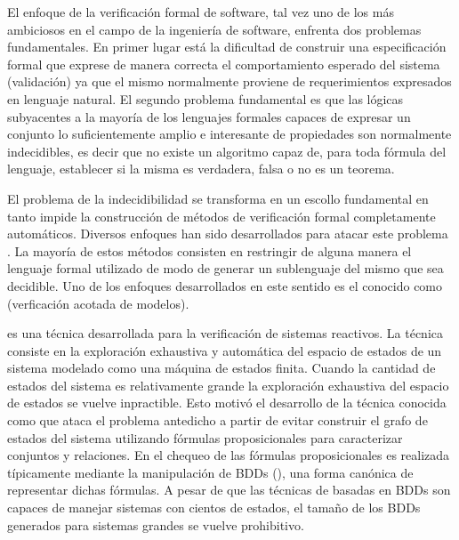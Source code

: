 El enfoque de la verificación formal de software, tal vez uno de los más
ambiciosos en el campo de la ingeniería de software, enfrenta dos problemas
fundamentales. En primer lugar está la dificultad de construir una
especificación formal que exprese de manera correcta el comportamiento
esperado del sistema (validación) ya que el mismo normalmente proviene de
requerimientos expresados en lenguaje natural. El segundo problema fundamental
es que las lógicas subyacentes a la mayoría de los lenguajes formales capaces
de expresar un conjunto lo suficientemente amplio e interesante de propiedades
son normalmente indecidibles, es decir que no existe un algoritmo capaz de,
para toda fórmula del lenguaje, establecer si la misma es verdadera, falsa o
no es un teorema.

El problema de la indecidibilidad se transforma en un escollo fundamental en
tanto impide la construcción de métodos de verificación formal completamente
automáticos. Diversos enfoques han sido desarrollados para atacar este
problema . La mayoría de estos métodos consisten en
restringir de alguna manera el lenguaje formal utilizado de modo de generar un
sublenguaje del mismo que sea decidible. Uno de los enfoques desarrollados en
este sentido es el conocido como \bmc (verficación acotada de modelos).

\mc\cite{emerson:scp-2_3} es una técnica desarrollada para la verificación de
sistemas reactivos. La técnica consiste en la exploración exhaustiva y
automática del espacio de estados de un sistema modelado como una máquina de
estados finita. Cuando la cantidad de estados del sistema es relativamente
grande la exploración exhaustiva del espacio de estados se vuelve inpractible.
Esto motivó el desarrollo de la técnica conocida como \smc\cite{burch:lics90,
mcmillan93} que ataca el problema antedicho a partir de evitar construir el
grafo de estados del sistema utilizando fórmulas proposicionales para
caracterizar conjuntos y relaciones. En \smc el chequeo de las fórmulas
proposicionales es realizada típicamente mediante la manipulación de BDDs
(\bdds), una forma canónica de representar dichas fórmulas. A pesar de que las
técnicas de \smc basadas en  BDDs son capaces de manejar sistemas con cientos de
estados, el tamaño de los BDDs generados para sistemas grandes se vuelve
prohibitivo. 


